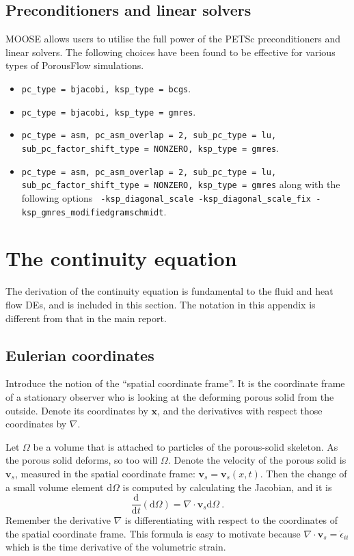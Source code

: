 \documentclass[12pt]{report}
\def\d{\mathrm{d}}
\begin{document}
\section{Preconditioners and linear solvers}

MOOSE allows users to utilise the full power of the PETSc
preconditioners and linear solvers.  The following choices have been
found to be effective for various types of PorousFlow simulations.
\begin{itemize}
\item {\tt pc\_type = bjacobi, ksp\_type = bcgs}.
\item {\tt pc\_type = bjacobi, ksp\_type = gmres}.
\item {\tt pc\_type = asm, pc\_asm\_overlap = 2, sub\_pc\_type = lu,
  sub\_pc\_factor\_shift\_type = NONZERO, 
  ksp\_type = gmres}.
\item {\tt pc\_type = asm, pc\_asm\_overlap = 2, sub\_pc\_type = lu,
  sub\_pc\_factor\_shift\_type = NONZERO, 
  ksp\_type = gmres} along with the following options {\tt
  -ksp\_diagonal\_scale -ksp\_diagonal\_scale\_fix
  -ksp\_gmres\_modifiedgramschmidt}.
\end{itemize}



\appendix

\chapter{The continuity equation}

The derivation of the continuity equation is fundamental to the fluid
and heat flow DEs, and is
included in this section.  The notation in this appendix is different
from that in the main report.

\section{Eulerian coordinates}

Introduce the notion of the ``spatial coordinate frame''.  It is the
coordinate frame of a stationary observer who is looking at the
deforming porous solid from the outside.  Denote its coordinates by
${\mathbf x}$, and the derivatives with respect those coordinates by
$\nabla$.

Let $\Omega$ be a volume that is attached to particles of the
porous-solid skeleton.  As the porous solid deforms, so too will
$\Omega$.  Denote the velocity of the porous solid is ${\mathbf
  v}_{s}$, measured in the spatial coordinate frame: ${\mathbf v}_{s}
= {\mathbf v}_{s}(x, t)$.  Then the change of a small volume element
$\d\Omega$ is computed by calculating the Jacobian, and it is
\begin{equation}
\frac{\d}{\d t} (\d\Omega) = \nabla\cdot{\mathbf v}_{s} \d\Omega \ .
\end{equation}
Remember the derivative $\nabla$ is differentiating with respect to
the coordinates of the spatial coordinate frame.  This formula is easy
to motivate because $\nabla\cdot{\mathbf v}_{s} = \dot{\epsilon}_{ii}$
which is the time derivative of the volumetric strain.
\end{document}

